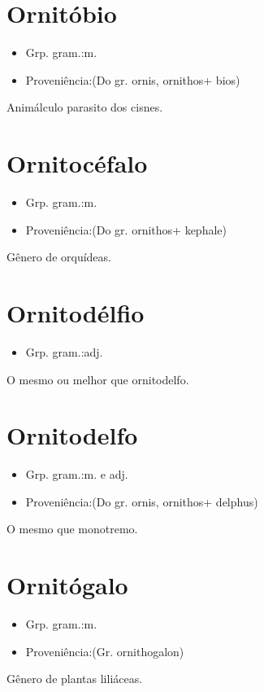 \section{Ornitóbio}
\begin{itemize}
\item {Grp. gram.:m.}
\end{itemize}
\begin{itemize}
\item {Proveniência:(Do gr. \textunderscore ornis\textunderscore , \textunderscore ornithos\textunderscore  + \textunderscore bios\textunderscore )}
\end{itemize}
Animálculo parasito dos cisnes.
\section{Ornitocéfalo}
\begin{itemize}
\item {Grp. gram.:m.}
\end{itemize}
\begin{itemize}
\item {Proveniência:(Do gr. \textunderscore ornithos\textunderscore  + \textunderscore kephale\textunderscore )}
\end{itemize}
Gênero de orquídeas.
\section{Ornitodélfio}
\begin{itemize}
\item {Grp. gram.:adj.}
\end{itemize}
O mesmo ou melhor que \textunderscore ornitodelfo\textunderscore .
\section{Ornitodelfo}
\begin{itemize}
\item {Grp. gram.:m.  e  adj.}
\end{itemize}
\begin{itemize}
\item {Proveniência:(Do gr. \textunderscore ornis\textunderscore , \textunderscore ornithos\textunderscore  + \textunderscore delphus\textunderscore )}
\end{itemize}
O mesmo que \textunderscore monotremo\textunderscore .
\section{Ornitógalo}
\begin{itemize}
\item {Grp. gram.:m.}
\end{itemize}
\begin{itemize}
\item {Proveniência:(Gr. \textunderscore ornithogalon\textunderscore )}
\end{itemize}
Gênero de plantas liliáceas.
